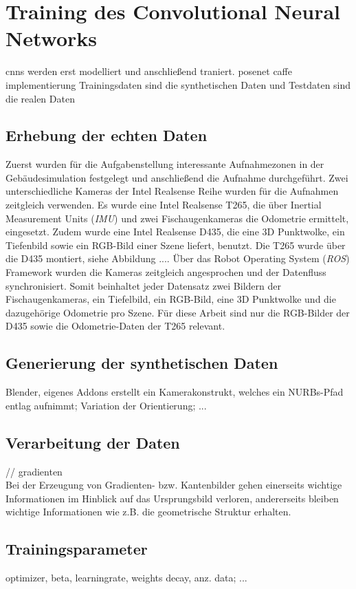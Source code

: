 
\section{Training des Convolutional Neural Networks}
cnns werden erst modelliert und anschließend traniert.
posenet caffe implementierung
Trainingsdaten sind die synthetischen Daten und Testdaten sind die realen Daten

\subsection{Erhebung der echten Daten}
Zuerst wurden für die Aufgabenstellung interessante Aufnahmezonen in der Gebäudesimulation festgelegt und anschließend die Aufnahme durchgeführt. Zwei unterschiedliche Kameras der Intel Realsense Reihe wurden  für die Aufnahmen zeitgleich verwenden. Es wurde eine Intel Realsense T265, die über Inertial Measurement Units (\textit{IMU}) und zwei Fischaugenkameras die Odometrie ermittelt, eingesetzt. Zudem wurde eine Intel Realsense D435, die eine 3D Punktwolke, ein Tiefenbild sowie ein RGB-Bild einer Szene liefert, benutzt. Die T265 wurde über die D435 montiert, siehe Abbildung .... Über das Robot Operating System (\textit{ROS}) Framework wurden die Kameras zeitgleich angesprochen und der Datenfluss synchronisiert. Somit beinhaltet jeder Datensatz zwei Bildern der Fischaugenkameras, ein Tiefelbild, ein RGB-Bild, eine 3D Punktwolke und die dazugehörige Odometrie pro Szene. Für diese Arbeit sind nur die RGB-Bilder der D435 sowie die Odometrie-Daten der T265 relevant.




\subsection{Generierung der synthetischen Daten}
Blender,
eigenes Addons erstellt ein Kamerakonstrukt, welches ein NURBs-Pfad entlag aufnimmt; Variation der Orientierung; ...

\subsection{Verarbeitung der Daten}
// gradienten\\
Bei der Erzeugung von Gradienten- bzw. Kantenbilder gehen einerseits wichtige Informationen im Hinblick auf das Ursprungsbild verloren, andererseits bleiben wichtige Informationen wie z.B. die geometrische Struktur erhalten.

\subsection{Trainingsparameter}
optimizer, beta,
learningrate,
weights decay, anz. data; ...